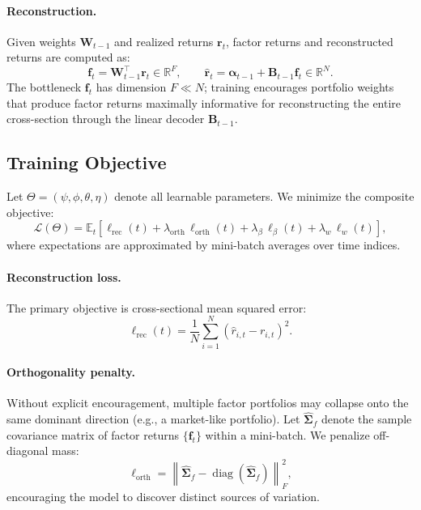 \paragraph{Reconstruction.} Given weights $\mathbf{W}_{t-1}$ and realized returns $\mathbf{r}_t$, factor returns and reconstructed returns are computed as:
\begin{equation}\label{eq:reconstruction}
    \mathbf{f}_t = \mathbf{W}_{t-1}^\top \mathbf{r}_t \in \mathbb{R}^F, \qquad \hat{\mathbf{r}}_t = \boldsymbol{\alpha}_{t-1} + \mathbf{B}_{t-1} \mathbf{f}_t \in \mathbb{R}^N.
\end{equation}
The bottleneck $\mathbf{f}_t$ has dimension $F \ll N$; training encourages portfolio weights that produce factor returns maximally informative for reconstructing the entire cross-section through the linear decoder $\mathbf{B}_{t-1}$.


\subsection{Training Objective}\label{sec:training}

Let $\Theta = (\psi, \phi, \theta, \eta)$ denote all learnable parameters. We minimize the composite objective:
\begin{equation}\label{eq:total-loss}
    \mathcal{L}(\Theta) = \mathbb{E}_{t}\!\left[\ell_{\mathrm{rec}}(t) + \lambda_{\mathrm{orth}}\,\ell_{\mathrm{orth}}(t) + \lambda_{\beta}\,\ell_{\beta}(t) + \lambda_{w}\,\ell_{w}(t)\right],
\end{equation}
where expectations are approximated by mini-batch averages over time indices.

\paragraph{Reconstruction loss.} The primary objective is cross-sectional mean squared error:
\begin{equation}\label{eq:rec-loss}
    \ell_{\mathrm{rec}}(t) = \frac{1}{N}\sum_{i=1}^{N} \left(\hat{r}_{i,t} - r_{i,t}\right)^2.
\end{equation}

\paragraph{Orthogonality penalty.} Without explicit encouragement, multiple factor portfolios may collapse onto the same dominant direction (e.g., a market-like portfolio). Let $\widehat{\boldsymbol{\Sigma}}_f$ denote the sample covariance matrix of factor returns $\{\mathbf{f}_t\}$ within a mini-batch. We penalize off-diagonal mass:
\begin{equation}\label{eq:orth-loss}
    \ell_{\mathrm{orth}} = \left\|\widehat{\boldsymbol{\Sigma}}_f - \operatorname{diag}\!\left(\widehat{\boldsymbol{\Sigma}}_f\right)\right\|_F^2,
\end{equation}
encouraging the model to discover distinct sources of variation.

